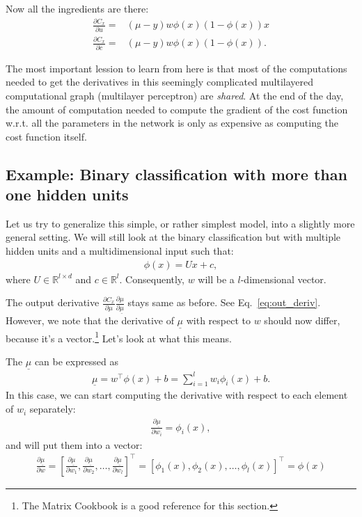 \documentclass{report}
\newcommand{\RR}[0]{\mathbb{R}}
\begin{document}
Now all the ingredients are there:
\begin{align*}
    \frac{\partial C_x}{\partial u} =& (\mu -y) w \phi(x) (1-\phi(x)) x \\
    \frac{\partial C_x}{\partial c} =& (\mu -y) w \phi(x) (1-\phi(x)).
\end{align*}

The most important lession to learn from here is that most of the computations
needed to get the derivatives in this seemingly complicated multilayered
computational graph (multilayer perceptron) are {\em shared}. At the end of the
day, the amount of computation needed to compute the gradient of the cost
function w.r.t. all the parameters in the network is only as expensive as
computing the cost function itself.

\subsection{Example: Binary classification with more than one hidden units}
\label{sec:example2}

Let us try to generalize this simple, or rather simplest model, into a slightly
more general setting. We will still look at the binary classification but with
multiple hidden units and a multidimensional input such that:
\begin{align*}
    \phi(x) = U x + c,
\end{align*}
where $U \in \RR^{l \times d}$ and $c \in \RR^l$. Consequently, $w$ will be a
$l$-dimensional vector.

The output derivative $\frac{\partial C_x}{\partial \mu}\frac{\partial
\mu}{\partial \underline{\mu}}$ stays same as before. See
Eq.~\eqref{eq:out_deriv}.
However, we note that the derivative of $\underline{\mu}$ with respect to $w$
should now differ, because it's a vector.\footnote{
    The Matrix Cookbook \cite{petersen2008matrix} is a good reference for this
    section.
}
Let's look at what this means.

The $\underline{\mu}$ can be expressed as
\begin{align}
    \label{eq:mu_vec}
    \underline{\mu} = w^\top \phi(x) + b = \sum_{i=1}^l w_i \phi_i(x) + b.
\end{align}
In this case, we can start computing the derivative with respect to each element
of $w_i$ separately:
\begin{align*}
    \frac{\partial \underline{\mu}}{\partial w_i} = \phi_i(x),
\end{align*}
and will put them into a vector:
\begin{align*}
    \frac{\partial \underline{\mu}}{\partial w} = \left[ 
        \frac{\partial \underline{\mu}}{\partial w_1}, \frac{\partial
        \underline{\mu}}{\partial w_2}, \ldots, \frac{\partial
        \underline{\mu}}{\partial w_l}
    \right]^\top = \left[ \phi_1(x), \phi_2(x), \ldots, \phi_l(x) \right]^\top
    = \phi(x)
\end{align*}
\end{document}
